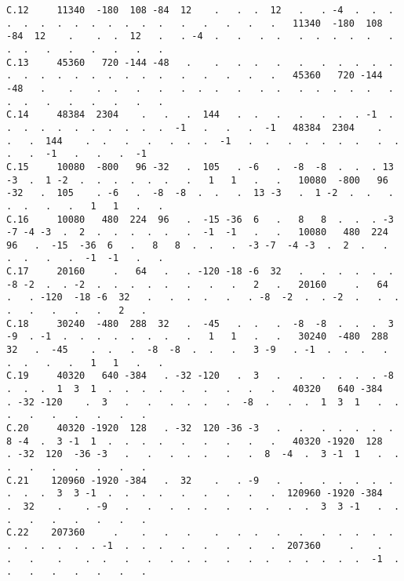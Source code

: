 \begin{verbatim}
C.12     11340  -180  108 -84  12    .   .  .  12   .   . -4  .  .  .  .  .  .  .  .  .  .  .  .  .   .   .   .   .   .   11340  -180  108 -84  12    .    .  .  12   .   . -4  .   .   .  .   .  .  .  .  .   .  .  .   .   .   .   .   .   .
C.13     45360   720 -144 -48   .    .   .  .   .   .   .  .  .  .  .  .  .  .  .  .  .  .  .  .  .   .   .   .   .   .   45360   720 -144 -48   .    .    .  .   .   .   .  .  .   .   .  .   .  .  .  .  .   .  .  .   .   .   .   .   .   .
C.14     48384  2304    .   .   .  144   .  .   .   .   .  .  . -1  .  .  .  .  .  .  .  .  .  .  .  -1   .   .   .  -1   48384  2304    .   .   .  144    .  .   .   .   .  .  .  -1   .  .   .  .  .  .  .   .  .  .   .  -1   .   .   .  -1
C.15     10080  -800   96 -32   .  105   . -6   .  -8  -8  .  .  . 13 -3  .  1 -2  .  .  .  .  .  .   .   1   1   .   .   10080  -800   96 -32   .  105    . -6   .  -8  -8  .  .   .  13 -3   .  1 -2  .  .   .  .  .   .   .   1   1   .   .
C.16     10080   480  224  96   .  -15 -36  6   .   8   8  .  .  . -3 -7 -4 -3  .  2  .  .  .  .  .   .  -1  -1   .   .   10080   480  224  96   .  -15  -36  6   .   8   8  .  .   .  -3 -7  -4 -3  .  2  .   .  .  .   .   .  -1  -1   .   .
C.17     20160     .   64   .   . -120 -18 -6  32   .   .  .  .  .  . -8 -2  .  . -2  .  .  .  .  .   .   .   .   2   .   20160     .   64   .   . -120  -18 -6  32   .   .  .  .   .   . -8  -2  .  . -2  .   .  .  .   .   .   .   .   2   .
C.18     30240  -480  288  32   .  -45   .  .   .  -8  -8  .  .  .  3 -9  . -1  .  .  .  .  .  .  .   .   1   1   .   .   30240  -480  288  32   .  -45    .  .   .  -8  -8  .  .   .   3 -9   . -1  .  .  .   .  .  .   .   .   1   1   .   .
C.19     40320   640 -384   . -32 -120   .  3   .   .   .  .  .  . -8  .  .  .  1  3  1  .  .  .  .   .   .   .   .   .   40320   640 -384   . -32 -120    .  3   .   .   .  .  .   .  -8  .   .  .  1  3  1   .  .  .   .   .   .   .   .   .
C.20     40320 -1920  128   . -32  120 -36 -3   .   .   .  .  .  .  .  8 -4  .  3 -1  1  .  .  .  .   .   .   .   .   .   40320 -1920  128   . -32  120  -36 -3   .   .   .  .  .   .   .  8  -4  .  3 -1  1   .  .  .   .   .   .   .   .   .
C.21    120960 -1920 -384   .  32    .   . -9   .   .   .  .  .  .  .  .  .  .  3  3 -1  .  .  .  .   .   .   .   .   .  120960 -1920 -384   .  32    .    . -9   .   .   .  .  .   .   .  .   .  .  3  3 -1   .  .  .   .   .   .   .   .   .
C.22    207360     .    .   .   .    .   .  .   .   .   .  .  .  .  .  .  .  .  .  .  . -1  .  .  .   .   .   .   .   .  207360     .    .   .   .    .    .  .   .   .   .  .  .   .   .  .   .  .  .  .  .  -1  .  .   .   .   .   .   .   .

\end{verbatim}
